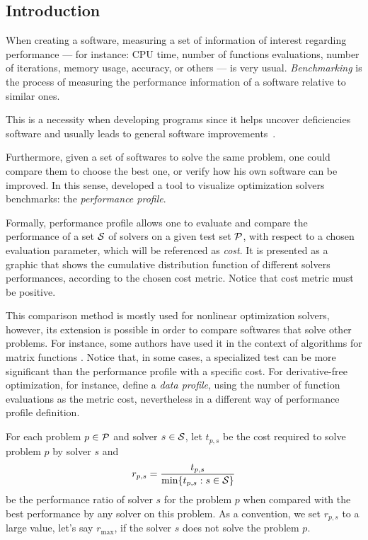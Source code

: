 \subsection*{Introduction}

    When creating a software,  measuring a set of
    information of interest regarding performance
    --- for instance: CPU time, number of
    functions evaluations, number of iterations, memory usage, accuracy, or
    others --- is very usual.   \emph{Benchmarking} is the process of measuring
    the performance  information of a software relative to similar ones.
    
    This is a necessity when developing programs since it
    helps uncover deficiencies software and usually leads
    to general software improvements~\cite
    {url:mittelmann,Mittelmann:1999fb,Dolan:2006kl}.

    Furthermore, given a set of softwares to solve the same problem, one could
    compare them to choose the best one, or verify how his own software can be
    improved. In this sense, \textcite{Dolan:2002du} developed a tool to 
    visualize optimization solvers benchmarks: the \emph{performance profile}.

    Formally,  performance profile allows one to evaluate and compare the
    performance
    of a set $\mathcal{S}$ of solvers  on a given test set $\mathcal{P}$, with respect
    to a chosen evaluation parameter,
    which will be referenced as \emph{cost}.
    It is presented as
    a graphic that shows the cumulative distribution function of different
    solvers performances, according to the chosen cost metric.
    Notice that cost metric must be positive.

    This comparison method is mostly used for nonlinear optimization solvers,
    however, its extension is possible in order to compare
    softwares that solve other problems.
    For instance, some authors have used it in the context of algorithms for
    matrix functions \cite{al-mohy:2009, al-mohy:2011, al-mohy:2012,
    higham:2005, higham:2009, higham:2011, higham:2013}.
    Notice that, in some cases, a
    specialized test can be more significant than the performance profile with
    a specific cost.  For derivative-free optimization, for instance,
    \textcite{More:2009benchmarking} define a \emph{data profile}, using the
    number of function evaluations as the metric cost, nevertheless in a 
    different way of performance profile definition.

    For each
    problem $p \in \mathcal{P}$ and solver $s \in \mathcal{S}$, let $t_{p,s}$ be the
    cost required to solve problem $p$ by solver $s$ and
    \begin{align*}
      r_{p,s} = \frac{t_{p,s}}{\min\{t_{p,s}: s \in \mathcal{S}\}}
    \end{align*}
    be the performance ratio of solver $s$ for the problem $p$ when compared
    with the best performance by any solver on this problem.
    As a convention, we set $r_{p,s}$ to a large value, let's say $r_{\max}$, if
    the solver $s$ does not solve the problem $p$.

